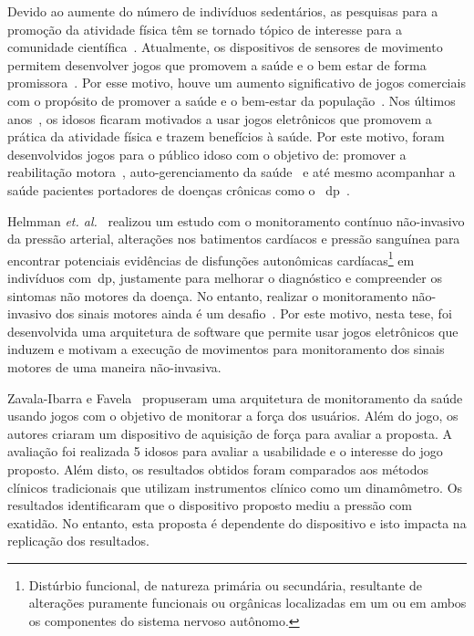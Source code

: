 Devido ao aumente do número de indivíduos sedentários, as pesquisas para a promoção da atividade física têm se tornado tópico de interesse para a comunidade científica~\cite{bartolome11,Mandryk2014}. Atualmente, os dispositivos de sensores de movimento permitem desenvolver jogos que promovem a saúde e o bem estar de forma promissora~\cite{seriousgameolder2015}. Por esse motivo, houve um aumento significativo de jogos comerciais com o propósito de promover a saúde e o bem-estar da população~\cite{wiiassesspark2016}. Nos últimos anos~\cite{physicalactivityolder2014}, os idosos ficaram motivados a usar jogos eletrônicos que promovem a prática da atividade física e trazem benefícios à saúde. Por este motivo, foram desenvolvidos jogos para o público idoso com o objetivo de: promover a reabilitação motora~\cite{cloudrehabi2014}, auto-gerenciamento da saúde~\cite{seriousgameolder2015} e até mesmo acompanhar a saúde pacientes portadores de doenças crônicas como o ~\ac{dp}~\cite{synnott_wiipd_2012,sacbespoke2014}. 

Helmman \textit{et. al.}~\cite{autonomparkin2015} realizou um estudo com o monitoramento contínuo não-invasivo da pressão arterial, alterações nos batimentos cardíacos e pressão sanguínea para encontrar potenciais evidências de disfunções autonômicas cardíacas\footnote{Distúrbio funcional, de natureza primária ou secundária, resultante de alterações  puramente funcionais ou orgânicas localizadas em um  ou em ambos os componentes do sistema nervoso autônomo.} em indivíduos com~\ac{dp}, justamente para melhorar o diagnóstico e compreender os sintomas não motores da doença. No entanto, realizar o monitoramento não-invasivo dos sinais motores ainda é um desafio~\cite{wiiassesspark2016,reviewassesenspark2015}. Por este motivo, nesta tese, foi desenvolvida uma arquitetura de software que permite usar jogos eletrônicos que induzem e motivam a execução de movimentos para monitoramento dos sinais motores de uma maneira não-invasiva.

Zavala-Ibarra e Favela~\cite{ambientgameolder2012} propuseram uma arquitetura de monitoramento da saúde usando jogos com o objetivo de monitorar a força dos usuários. Além do jogo, os autores criaram um dispositivo de aquisição de força para avaliar a proposta. A avaliação foi realizada 5 idosos para avaliar a usabilidade e o interesse do jogo proposto. Além disto, os resultados obtidos foram comparados aos métodos clínicos tradicionais que utilizam instrumentos clínico como um dinamômetro. Os resultados identificaram que o dispositivo proposto mediu a pressão com exatidão. No entanto, esta proposta é dependente do dispositivo e isto impacta na replicação dos resultados. 
 

